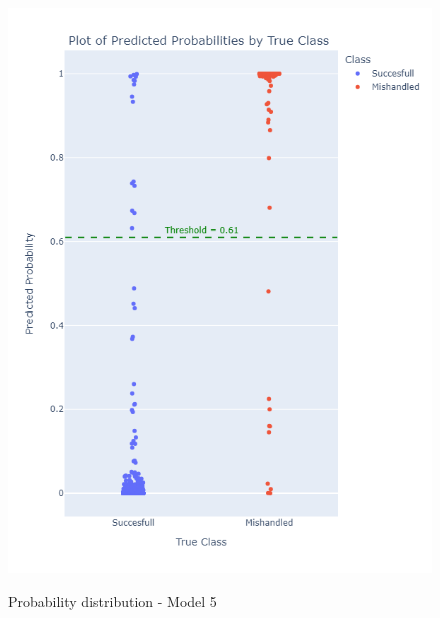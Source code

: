 \documentclass[12pt]{article}
\begin{document}
\begin{figure}
\begin{minipage}[c]{0.4\linewidth}
    \includegraphics[width=1\textwidth]{Probability_distribution_Model 5.png}\\
    \caption{Probability distribution - Model 5}
\end{minipage}
\end{figure}
\end{document}
